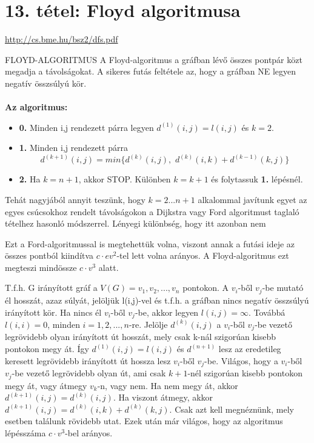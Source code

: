\section{13. tétel: Floyd algoritmusa}

\url{http://cs.bme.hu/bsz2/dfs.pdf}

\begin{tetel}{FLOYD-ALGORITMUS}
  A Floyd-algoritmus a gráfban lévő összes pontpár közt megadja a távolságokat.  A sikeres futás feltétele az, hogy a gráfban NE legyen negatív összsúlyú kör.\\
  \\
  \textbf{Az algoritmus:}
  \begin{itemize}
  \item{\textbf{0.}} Minden i,j rendezett párra legyen $d^{(1)}(i,j) = l(i,j)$ és $k=2$.
  \item{\textbf{1.}} Minden i,j rendezett párra
    $$d^{(k+1)}(i,j) = min\{d^{(k)}(i,j),\,\, d^{(k)}(i,k) + d^{(k-1)}(k,j)\}$$
  \item{\textbf{2.}} Ha $k = n + 1$, akkor STOP. Különben $k = k + 1$ és folytassuk \textbf{1.} lépésnél.
  \end{itemize}

  Tehát nagyjából annyit teszünk, hogy $k = 2 ... n+1$ alkalommal javítunk egyet az egyes csúcsokhoz rendelt távolságokon a Dijkstra vagy Ford algoritmust taglaló tételhez hasonló módszerrel. Lényegi különbség, hogy itt azonban nem 
  
  Ezt a Ford-algoritmussal is megtehettük volna, viszont annak a futási ideje az összes pontból kiindítva $c\cdot ev^2$-tel lett volna arányos. A Floyd-algoritmus ezt megteszi mindössze $c\cdot v^3$ alatt.
\end{tetel}
\begin{bizonyitas}{}
T.f.h. G irányított gráf a $V(G) = {v_1, v_2,..., v_n}$ pontokon. A $v_i$-ből $v_j$-be mutató él hosszát, azaz súlyát, jelöljük l(i,j)-vel és t.f.h. a gráfban nincs negatív összsúlyú irányított kör. Ha nincs él $v_i$-ből $v_j$-be, akkor legyen $l(i,j) = \infty$. Továbbá $l(i,i) = 0$, minden $i = 1, 2,..., n$-re. Jelölje $d^{(k)}(i,j)$ a $v_i$-ből $v_j$-be vezető legrövidebb olyan irányított út hosszát, mely csak k-nál szigorúan kisebb pontokon megy át. Így $d^{(1)}(i,j) = l(i,j)$ és $d^{(n+1)}$ lesz az eredetileg keresett legrövidebb irányított út hossza lesz $v_i$-ből $v_j$-be. Világos, hogy a $v_i$-ből $v_j$-be vezető legrövidebb olyan út, ami csak $k + 1$-nél szigorúan kisebb pontokon megy át, vagy átmegy $v_k$-n, vagy nem. Ha nem megy át, akkor $d^{(k+1)}(i,j) = d^{(k)}(i,j)$. Ha viszont átmegy, akkor $d^{(k+1)}(i,j) = d^{(k)}(i,k) + d^{(k)}(k,j)$. Csak azt kell megnéznünk, mely esetben találunk rövidebb utat. Ezek után már világos, hogy az algoritmus lépésszáma $c\cdot v^3$-bel arányos.
\end{bizonyitas}


